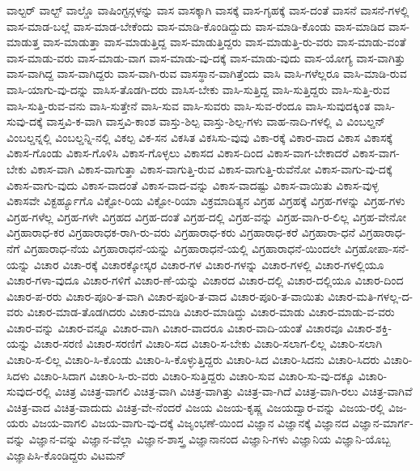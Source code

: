 {ವಾಲ್ಟರ್
ವಾಲ್ಟ್
ವಾಲ್ಡೊ
ವಾಷಿಂಗ್ಟನ್ಗಳನ್ನು
ವಾಸ
ವಾಸಕ್ಕಾಗಿ
ವಾಸಕ್ಕೆ
ವಾಸ-ಗೃಹಕ್ಕೆ
ವಾಸ-ದಂತೆ
ವಾಸನೆ
ವಾಸನೆ-ಗಳಲ್ಲಿ
ವಾಸ-ಮಾಡ-ಬಲ್ಲೆ
ವಾಸ-ಮಾಡ-ಬೇಕೆಂದು
ವಾಸ-ಮಾಡಿ-ಕೊಂಡಿದ್ದುದು
ವಾಸ-ಮಾಡಿ-ಕೊಂಡು
ವಾಸ-ಮಾಡಿದ
ವಾಸ-ಮಾಡುತ್ತ
ವಾಸ-ಮಾಡುತ್ತಾ
ವಾಸ-ಮಾಡುತ್ತಿದ್ದ
ವಾಸ-ಮಾಡುತ್ತಿದ್ದರು
ವಾಸ-ಮಾಡುತ್ತಿ-ರು-ವರು
ವಾಸ-ಮಾಡು-ವಂತೆ
ವಾಸ-ಮಾಡು-ವರು
ವಾಸ-ಮಾಡು-ವಾಗ
ವಾಸ-ಮಾಡು-ವು-ದಕ್ಕೆ
ವಾಸ-ಮಾಡು-ವುದು
ವಾಸ-ಯೋಗ್ಯ
ವಾಸ-ವಾಗಿತ್ತು
ವಾಸ-ವಾಗಿದ್ದ
ವಾಸ-ವಾಗಿದ್ದರು
ವಾಸ-ವಾಗಿ-ರುವ
ವಾಸಸ್ಥಾನ-ವಾಗಿತ್ತೆಂದು
ವಾಸಿ
ವಾಸಿ-ಗಳೆಲ್ಲರೂ
ವಾಸಿ-ಮಾಡಿ-ರುವ
ವಾಸಿ-ಯಾಗು-ವು-ದನ್ನು
ವಾಸಿಸ-ತೊಡಗಿ-ದರು
ವಾಸಿಸ-ಬೇಕು
ವಾಸಿ-ಸುತ್ತಿದ್ದ
ವಾಸಿ-ಸುತ್ತಿದ್ದರು
ವಾಸಿ-ಸುತ್ತಿ-ರುವ
ವಾಸಿ-ಸುತ್ತಿ-ರುವ-ವನು
ವಾಸಿ-ಸುತ್ತೇನೆ
ವಾಸಿ-ಸುವ
ವಾಸಿ-ಸುವರು
ವಾಸಿ-ಸುವ-ರೆಂದೂ
ವಾಸಿ-ಸುವುದಕ್ಕಿಂತ
ವಾಸಿ-ಸುವು-ದಕ್ಕೆ
ವಾಸ್ತವಿ-ಕ-ವಾಗಿ
ವಾಸ್ತವಿ-ಕಾಂಶ
ವಾಸ್ತು-ಶಿಲ್ಪ
ವಾಸ್ತು-ಶಿಲ್ಪ-ಗಳು
ವಾಹ-ನಾದಿ-ಗಳಲ್ಲಿ
ವಿ
ವಿಂಬಲ್ಡನ್
ವಿಂಬಲ್ಡನ್ನಲ್ಲಿ
ವಿಂಬಲ್ಡನ್ನಿ-ನಲ್ಲಿ
ವಿಕಲ್ಪ
ವಿಕ-ಸನ
ವಿಕಸಿತ
ವಿಕಸಿಸು-ವುವು
ವಿಕಾ-ರಕ್ಕೆ
ವಿಕಾರ-ವಾದ
ವಿಕಾಸ
ವಿಕಾಸಕ್ಕೆ
ವಿಕಾಸ-ಗೊಂಡು
ವಿಕಾಸ-ಗೊಳಿಸಿ
ವಿಕಾಸ-ಗೊಳ್ಳಲು
ವಿಕಾಸದ
ವಿಕಾಸ-ದಿಂದ
ವಿಕಾಸ-ವಾಗ-ಬೇಕಾದರೆ
ವಿಕಾಸ-ವಾಗ-ಬೇಕು
ವಿಕಾಸ-ವಾಗಿ
ವಿಕಾಸ-ವಾಗುತ್ತಾ
ವಿಕಾಸ-ವಾಗುತ್ತಿ-ರುವ
ವಿಕಾಸ-ವಾಗುತ್ತಿ-ರುವೆನೋ
ವಿಕಾಸ-ವಾಗು-ವು-ದಕ್ಕೆ
ವಿಕಾಸ-ವಾಗು-ವುದು
ವಿಕಾಸ-ವಾದಂತೆ
ವಿಕಾಸ-ವಾದ-ವನ್ನು
ವಿಕಾಸ-ವಾದಷ್ಟು
ವಿಕಾಸ-ವಾಯಿತು
ವಿಕಾಸ-ವುಳ್ಳ
ವಿಕಾಸವೇ
ವಿಕ್ಟರ್ಹ್ಯೂಗೊ
ವಿಕ್ಟೋ-ರಿಯ
ವಿಕ್ಟೋ-ರಿಯಾ
ವಿಕ್ರಮಾದಿತ್ಯನ
ವಿಗ್ರಹ
ವಿಗ್ರಹಕ್ಕೆ
ವಿಗ್ರಹ-ಗಳನ್ನು
ವಿಗ್ರಹ-ಗಳು
ವಿಗ್ರಹ-ಗಳೆಲ್ಲ
ವಿಗ್ರಹ-ಗಳೇ
ವಿಗ್ರಹದ
ವಿಗ್ರಹ-ದಂತೆ
ವಿಗ್ರಹ-ದಲ್ಲಿ
ವಿಗ್ರಹ-ವನ್ನು
ವಿಗ್ರಹ-ವಾಗಿ-ರ-ಲಿಲ್ಲ
ವಿಗ್ರಹ-ವೇನೋ
ವಿಗ್ರಹಾರಾಧ-ಕರ
ವಿಗ್ರಹಾರಾಧಕ-ರಾಗಿ-ರು-ವರು
ವಿಗ್ರಹಾರಾಧ-ಕರು
ವಿಗ್ರಹಾರಾಧ-ಕರೆ
ವಿಗ್ರಹಾರಾ-ಧನೆ
ವಿಗ್ರಹಾರಾಧ-ನೆಗೆ
ವಿಗ್ರಹಾರಾಧ-ನೆಯ
ವಿಗ್ರಹಾರಾಧನೆ-ಯನ್ನು
ವಿಗ್ರಹಾರಾಧನೆ-ಯಲ್ಲಿ
ವಿಗ್ರಹಾರಾಧನೆ-ಯಿಂದಲೇ
ವಿಗ್ರಹೋಪಾ-ಸನೆ-ಯನ್ನು
ವಿಚಾರ
ವಿಚಾ-ರಕ್ಕೆ
ವಿಚಾರಕ್ಕೋಸ್ಕರ
ವಿಚಾರ-ಗಳ
ವಿಚಾರ-ಗಳನ್ನು
ವಿಚಾರ-ಗಳಲ್ಲಿ
ವಿಚಾರ-ಗಳಲ್ಲಿಯೂ
ವಿಚಾರ-ಗಳಾ-ವುದೂ
ವಿಚಾರ-ಗಳಿಗೆ
ವಿಚಾರ-ಣೆ-ಯನ್ನು
ವಿಚಾರದ
ವಿಚಾರ-ದಲ್ಲಿ
ವಿಚಾರ-ದಲ್ಲಿಯೂ
ವಿಚಾರ-ದಿಂದ
ವಿಚಾರ-ಪ-ರರು
ವಿಚಾರ-ಪೂರಿ-ತ-ವಾಗಿ
ವಿಚಾರ-ಪೂರಿ-ತ-ವಾದ
ವಿಚಾರ-ಪೂರಿ-ತ-ವಾಯಿತು
ವಿಚಾರ-ಮತಿ-ಗಳಲ್ಲ-ದ-ವರು
ವಿಚಾರ-ಮಾಡ-ತೊಡಗಿದರು
ವಿಚಾರ-ಮಾಡಿ
ವಿಚಾರ-ಮಾಡಿದ್ದು
ವಿಚಾರ-ಮಾಡು
ವಿಚಾರ-ಮಾಡು-ವ-ವರು
ವಿಚಾರ-ವನ್ನು
ವಿಚಾರ-ವನ್ನೂ
ವಿಚಾರ-ವಾಗಿ
ವಿಚಾರ-ವಾದರೂ
ವಿಚಾರ-ವಾದಿ-ಯಂತೆ
ವಿಚಾರವೂ
ವಿಚಾರ-ಶಕ್ತಿ-ಯನ್ನು
ವಿಚಾರ-ಸರಣಿ
ವಿಚಾರ-ಸರಣಿಗೆ
ವಿಚಾರಿ-ಸದ
ವಿಚಾರಿ-ಸ-ಬೇಕು
ವಿಚಾರಿ-ಸಲಾಗ-ಲಿಲ್ಲ
ವಿಚಾರಿ-ಸಲಾಗಿ
ವಿಚಾರಿ-ಸ-ಲಿಲ್ಲ
ವಿಚಾರಿ-ಸಿ-ಕೊಂಡು
ವಿಚಾರಿ-ಸಿ-ಕೊಳ್ಳುತ್ತಿದ್ದರು
ವಿಚಾರಿ-ಸಿದ
ವಿಚಾರಿ-ಸಿದನು
ವಿಚಾರಿ-ಸಿದರು
ವಿಚಾರಿ-ಸಿದಳು
ವಿಚಾರಿ-ಸಿದಾಗ
ವಿಚಾರಿ-ಸಿ-ರು-ವರು
ವಿಚಾರಿ-ಸುತ್ತಿದ್ದರು
ವಿಚಾರಿ-ಸುವ
ವಿಚಾರಿ-ಸು-ವು-ದಕ್ಕೂ
ವಿಚಾರಿ-ಸುವುದ-ರಲ್ಲಿ
ವಿಚಿತ್ರ
ವಿಚಿತ್ರ-ವಾಗಲಿ
ವಿಚಿತ್ರ-ವಾಗಿ
ವಿಚಿತ್ರ-ವಾಗಿತ್ತು
ವಿಚಿತ್ರ-ವಾ-ಗಿದೆ
ವಿಚಿತ್ರ-ವಾಗಿ-ರಲು
ವಿಚಿತ್ರ-ವಾಗಿವೆ
ವಿಚಿತ್ರ-ವಾದ
ವಿಚಿತ್ರ-ವಾದುದು
ವಿಚಿತ್ರ-ವೇ-ನೆಂದರೆ
ವಿಜಯ
ವಿಜಯ-ಕೃಷ್ಣ
ವಿಜಯದ್ವಾರ-ವನ್ನು
ವಿಜಯ-ರಲ್ಲಿ
ವಿಜ-ಯರು
ವಿಜಯ-ವಾಗಲಿ
ವಿಜಯ-ವಾಗು-ವು-ದಕ್ಕೆ
ವಿಜೃಂಭಣೆ-ಯಿಂದ
ವಿಜ್ಞಾನ
ವಿಜ್ಞಾನಕ್ಕೆ
ವಿಜ್ಞಾನದ
ವಿಜ್ಞಾನ-ಮಾರ್ಗ-ವನ್ನು
ವಿಜ್ಞಾನ-ವನ್ನು
ವಿಜ್ಞಾನ-ವೆಲ್ಲಾ
ವಿಜ್ಞಾನ-ಶಾಸ್ತ್ರ
ವಿಜ್ಞಾನಾನಂದ
ವಿಜ್ಞಾನಿ-ಗಳು
ವಿಜ್ಞಾನಿಯ
ವಿಜ್ಞಾನಿ-ಯೊಬ್ಬ
ವಿಜ್ಞಾಪಿಸಿ-ಕೊಂಡಿದ್ದರು
ವಿಟಮನ್
}

